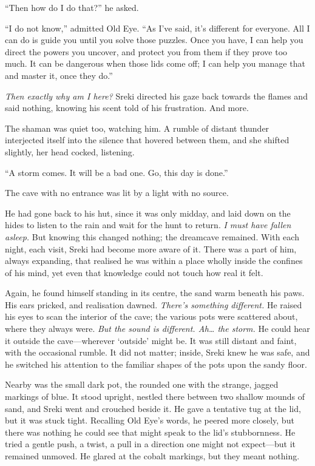 ``Then how do I do that?'' he asked.

``I do not know,'' admitted Old Eye. ``As I've said, it's different for everyone. All I can do is guide you until you solve those puzzles. Once you have, I can help you direct the powers you uncover, and protect you from them if they prove too much. It can be dangerous when those lids come off; I can help you manage that and master it, once they do.''

\emph{Then exactly why am I here?} Sreki directed his gaze back towards the flames and said nothing, knowing his scent told of his frustration. And more.

The shaman was quiet too, watching him. A rumble of distant thunder interjected itself into the silence that hovered between them, and she shifted slightly, her head cocked, listening.

``A storm comes. It will be a bad one. Go, this day is done.''

\secdiv

The cave with no entrance was lit by a light with no source.

He had gone back to his hut, since it was only midday, and laid down on the hides to listen to the rain and wait for the hunt to return. \emph{I must have fallen asleep.} But knowing this changed nothing; the dreamcave remained. With each night, each visit, Sreki had become more aware of it. There was a part of him, always expanding, that realised he was within a place wholly inside the confines of his mind, yet even that knowledge could not touch how real it felt.

Again, he found himself standing in its centre, the sand warm beneath his paws. His ears pricked, and realisation dawned. \emph{There's something different.} He raised his eyes to scan the interior of the cave; the various pots were scattered about, where they always were. \emph{But the sound is different. Ah\ldots{} the storm.} He could hear it outside the cave---wherever `outside' might be. It was still distant and faint, with the occasional rumble. It did not matter; inside, Sreki knew he was safe, and he switched his attention to the familiar shapes of the pots upon the sandy floor.

Nearby was the small dark pot, the rounded one with the strange, jagged markings of blue. It stood upright, nestled there between two shallow mounds of sand, and Sreki went and crouched beside it. He gave a tentative tug at the lid, but it was stuck tight. Recalling Old Eye's words, he peered more closely, but there was nothing he could see that might speak to the lid's stubbornness. He tried a gentle push, a twist, a pull in a direction one might not expect---but it remained unmoved. He glared at the cobalt markings, but they meant nothing.

